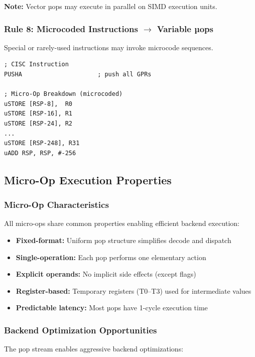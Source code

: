 \documentclass[12pt]{article}
\begin{document}
\textbf{Note:} Vector µops may execute in parallel on SIMD execution units.

\subsubsection{Rule 8: Microcoded Instructions $\rightarrow$ Variable µops}

Special or rarely-used instructions may invoke microcode sequences.

\begin{lstlisting}
; CISC Instruction
PUSHA                     ; push all GPRs

; Micro-Op Breakdown (microcoded)
uSTORE [RSP-8],  R0
uSTORE [RSP-16], R1
uSTORE [RSP-24], R2
...
uSTORE [RSP-248], R31
uADD RSP, RSP, #-256
\end{lstlisting}

\subsection{Micro-Op Execution Properties}

\subsubsection{Micro-Op Characteristics}

All micro-ops share common properties enabling efficient backend execution:

\begin{itemize}
    \item \textbf{Fixed-format:} Uniform µop structure simplifies decode and dispatch
    \item \textbf{Single-operation:} Each µop performs one elementary action
    \item \textbf{Explicit operands:} No implicit side effects (except flags)
    \item \textbf{Register-based:} Temporary registers (T0--T3) used for intermediate values
    \item \textbf{Predictable latency:} Most µops have 1-cycle execution time
\end{itemize}

\subsubsection{Backend Optimization Opportunities}

The µop stream enables aggressive backend optimizations:
\end{document}
